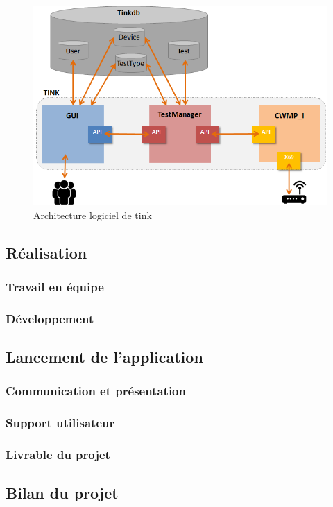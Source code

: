 \documentclass[12pt,a4paper]{report}
\begin{document}
\begin{figure}[!ht]
    \center
    \includegraphics[scale=0.87]{./img/archi_logi.png}
    \caption{Architecture logiciel de \gls{tink}}
\end{figure}
\subsection{Réalisation}
\subsubsection{Travail en équipe}
\subsubsection{Développement}

\subsection{Lancement de l'application}
\subsubsection{Communication et présentation}
\subsubsection{Support utilisateur}
\subsubsection{Livrable du projet}

\subsection{Bilan du projet}
\end{document}
